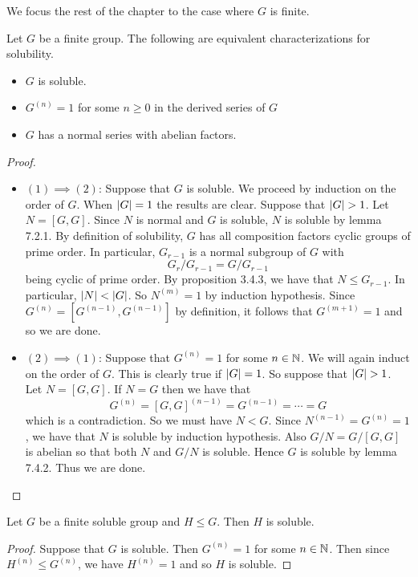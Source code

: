 \documentclass[a4paper]{article}
\begin{document}
We focus the rest of the chapter to the case where $G$ is finite. 

\begin{thm}{}{} Let $G$ be a finite group. The following are equivalent characterizations for solubility. 
\begin{itemize}
\item $G$ is soluble. 
\item $G^{(n)}=1$ for some $n\geq 0$ in the derived series of $G$
\item $G$ has a normal series with abelian factors. 
\end{itemize} 
\begin{proof}~\\
\begin{itemize}
\item $(1)\implies(2)$: Suppose that $G$ is soluble. We proceed by induction on the order of $G$. When $\abs{G}=1$ the results are clear. Suppose that $\abs{G}>1$. Let $N=[G,G]$. Since $N$ is normal and $G$ is soluble, $N$ is soluble by lemma 7.2.1. By definition of solubility, $G$ has all composition factors cyclic groups of prime order. In particular, $G_{r-1}$ is a normal subgroup of $G$ with $$G_r/G_{r-1}=G/G_{r-1}$$ being cyclic of prime order. By proposition 3.4.3, we have that $N\leq G_{r-1}$. In particular, $\abs{N}<\abs{G}$. So $N^{(m)}=1$ by induction hypothesis. Since $G^{(n)}=[G^{(n-1)},G^{(n-1)}]$ by definition, it follows that $G^{(m+1)}=1$ and so we are done. 
\item $(2)\implies(1)$: Suppose that $G^{(n)}=1$ for some $n\in\mathbb{N}$. We will again induct on the order of $G$. This is clearly true if $\abs{G}=1$. So suppose that $\abs{G}>1$. Let $N=[G,G]$. If $N=G$ then we have that $$G^{(n)}=[G,G]^{(n-1)}=G^{(n-1)}=\cdots=G$$ which is a contradiction. So we must have $N<G$. Since $N^{(n-1)}=G^{(n)}=1$, we have that $N$ is soluble by induction hypothesis. Also $G/N=G/[G,G]$ is abelian so that both $N$ and $G/N$ is soluble. Hence $G$ is soluble by lemma 7.4.2. Thus we are done. 
\end{itemize}
\end{proof}
\end{thm}

\begin{crl}{}{} Let $G$ be a finite soluble group and $H\leq G$. Then $H$ is soluble. 
\begin{proof}
Suppose that $G$ is soluble. Then $G^{(n)}=1$ for some $n\in\mathbb{N}$. Then since $H^{(n)}\leq G^{(n)}$, we have $H^{(n)}=1$ and so $H$ is soluble. 
\end{proof}
\end{crl}
\end{document}
